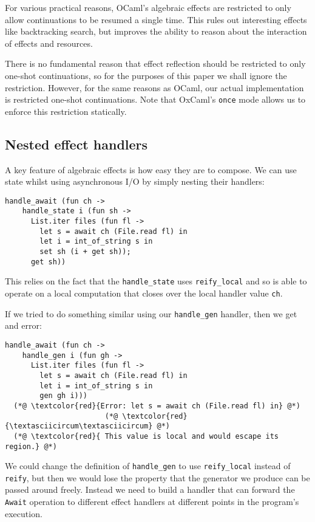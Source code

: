 \documentclass[acmsmall, screen, nonacm]{acmart}
\theoremstyle{definition}
\begin{document}
For various practical reasons, OCaml's algebraic effects are restricted
to only allow continuations to be resumed a single time. This rules out
interesting effects like backtracking search, but improves the ability
to reason about the interaction of effects and resources.

There is no fundamental reason that effect reflection should be
restricted to only one-shot continuations, so for the purposes of this
paper we shall ignore the restriction. However, for the same reasons as
OCaml, our actual implementation is restricted one-shot
continuations. Note that OxCaml's \lstinline[style=oxcaml]{once}
mode\cite{lorenzen2024oxidizing} allows us to enforce this restriction
statically.

\subsection{Nested effect handlers}

A key feature of algebraic effects is how easy they are to compose. We
can use state whilst using asynchronous I/O by simply nesting their
handlers:
\begin{lstlisting}[style=oxcaml]
  handle_await (fun ch ->
    handle_state i (fun sh ->
      List.iter files (fun fl ->
        let s = await ch (File.read fl) in
        let i = int_of_string s in
        set sh (i + get sh));
      get sh))
\end{lstlisting}

This relies on the fact that the \lstinline[style=oxcaml]{handle_state}
uses \lstinline[style=oxcaml]{reify_local} and so is able to operate on a
local computation that closes over the local handler value
\lstinline[style=oxcaml]{ch}.

If we tried to do something similar using our
\lstinline[style=oxcaml]{handle_gen} handler, then we get and error:
\begin{lstlisting}[style=oxcaml]
  handle_await (fun ch ->
    handle_gen i (fun gh ->
      List.iter files (fun fl ->
        let s = await ch (File.read fl) in
        let i = int_of_string s in
        gen gh i)))
  (*@ \textcolor{red}{Error: let s = await ch (File.read fl) in} @*)
                       (*@ \textcolor{red}{\textasciicircum\textasciicircum} @*)
  (*@ \textcolor{red}{ This value is local and would escape its region.} @*)
\end{lstlisting}

We could change the definition of \lstinline[style=oxcaml]{handle_gen} to
use \lstinline[style=oxcaml]{reify_local} instead of
\lstinline[style=oxcaml]{reify}, but then we would lose the property that
the generator we produce can be passed around freely. Instead we need to
build a handler that can forward the \lstinline[style=oxcaml]{Await}
operation to different effect handlers at different points in the
program's execution.
\end{document}
